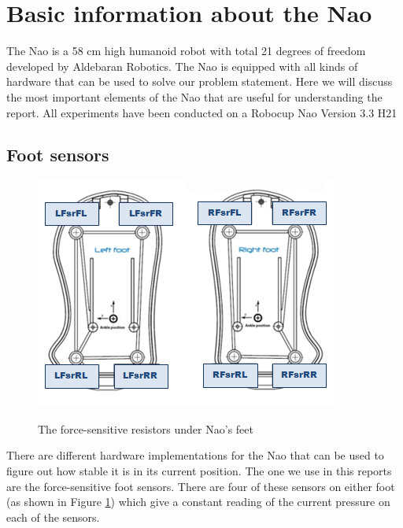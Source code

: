 \documentclass[a4paper]{article}
\begin{document}
\section{Basic information about the Nao}
The Nao is a 58 cm high humanoid robot with total 21 degrees of freedom developed by Aldebaran Robotics. The Nao
is equipped with all kinds of hardware that can be used to solve our problem
statement. Here we will discuss the most
important elements of the Nao that are useful for understanding the report. All
experiments have been conducted on a Robocup Nao Version 3.3 H21

\subsection{Foot sensors} 
\begin{figure}[htb]
	\centering
	\includegraphics[scale=0.75]{pics/naosfeet.jpg}
	\label{fig:fsr_plot2}
	\caption{The force-sensitive resistors under Nao's feet}
\end{figure}
There are different hardware implementations for the
Nao that can be used to figure out how stable it is in its current position. The one we use in this
reports are the force-sensitive foot sensors. There are four of these sensors on either foot
(as shown in Figure \ref{fig:fsr_plot2})
which give a constant reading of the current pressure on each of the sensors.
\end{document}
